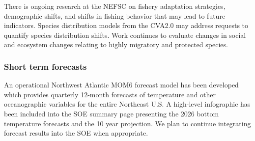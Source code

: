 \documentclass[
  10pt,
]{article}
\begin{document}
There is ongoing research at the NEFSC on fishery adaptation strategies,
demographic shifts, and shifts in fishing behavior that may lead to
future indicators. Species distribution models from the CVA2.0 may
address requests to quantify species distribution shifts. Work continues
to evaluate changes in social and ecosystem changes relating to highly
migratory and protected species.

\subsubsection{Short term forecasts}\label{short-term-forecasts-1}

An operational Northwest Atlantic MOM6 forecast model has been developed
which provides quarterly 12-month forecasts of temperature and other
oceanographic variables for the entire Northeast U.S. A high-level
infographic has been included into the SOE summary page presenting the
2026 bottom temperature forecasts and the 10 year projection. We plan to
continue integrating forecast results into the SOE when appropriate.
\end{document}
